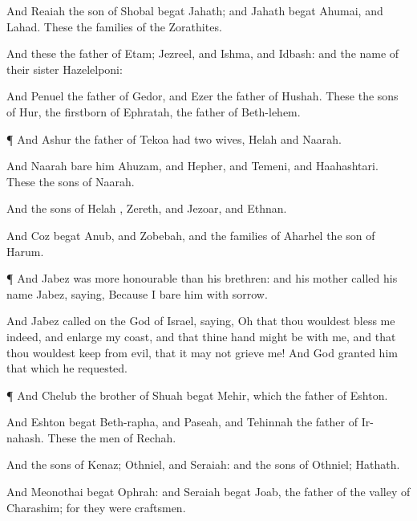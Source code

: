 {And
Reaiah the
son of
Shobal
begat
Jahath; and
Jahath
begat
Ahumai, and
Lahad. These
{} the
families of the
Zorathites.

And these
{} the
father of
Etam;
Jezreel, and
Ishma, and
Idbash: and the
name of their
sister
{}
Hazelelponi:

And
Penuel the
father of
Gedor, and
Ezer the
father of
Hushah. These
{} the
sons of
Hur, the
firstborn of
Ephratah, the
father of
Beth-lehem.


\par }{\PP {}¶ And
Ashur the
father of
Tekoa had
two
wives,
Helah and
Naarah.

And
Naarah
bare him
Ahuzam, and
Hepher, and
Temeni, and
Haahashtari. These
{} the
sons of
Naarah.

And the
sons of
Helah
{},
Zereth, and
Jezoar, and
Ethnan.

And
Coz
begat
Anub, and
Zobebah, and the
families of
Aharhel the
son of
Harum.


\par }{\PP {}¶ And
Jabez was more
honourable than his
brethren: and his
mother
called his
name
Jabez,
saying, Because I
bare him with
sorrow.

And
Jabez
called on the
God of
Israel,
saying, Oh
that thou wouldest
bless me
indeed, and
enlarge my
coast, and that thine
hand might be with me, and that thou wouldest
keep
{} from
evil, that it may not
grieve me! And
God
granted him that which he
requested.


\par }{\PP {}¶ And
Chelub the
brother of
Shuah
begat
Mehir, which
{} the
father of
Eshton.

And
Eshton
begat
Beth-rapha, and
Paseah, and
Tehinnah the
father of
Ir-nahash. These
{} the
men of
Rechah.

And the
sons of
Kenaz;
Othniel, and
Seraiah: and the
sons of
Othniel;
Hathath.

And
Meonothai
begat
Ophrah: and
Seraiah
begat
Joab, the
father of the
valley of
Charashim; for they were
craftsmen.

}

